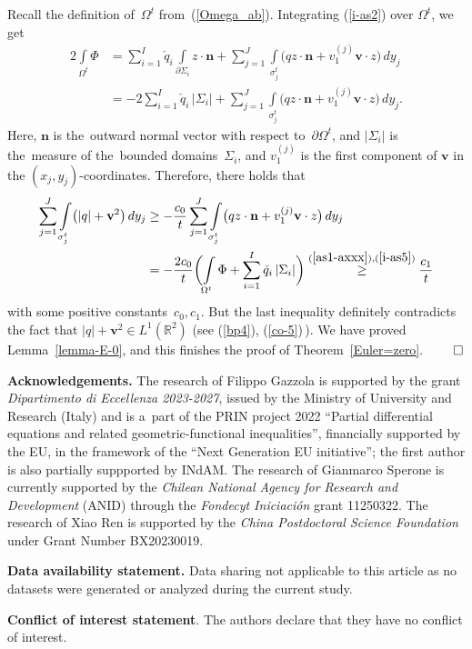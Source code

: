\documentclass[11pt]{article}
\numberwithin{equation}{section}
\numberwithin{figure}{section}
\newcommand{\R}{\mathbb{R}}
\def\R{{\mathbb R}}
\def\ve{{\mathbf v}}
\def\n{{\mathbf n}}
\begin{document}
Recall the definition of~$\Omega^t$ from~(\ref{Omega_ab}). 
Integrating (\ref{i-as2}) over $\Omega^t$, we get
\begin{align}\label{i-as8}
	2\int\limits_{\Omega^t}\Phi&=
\sum\limits_{i=1}^I\check q_i\int\limits_{\partial\Sigma_i}z\cdot\n+
\sum\limits_{j=1}^J\int\limits_{\sigma^t_j}\bigl(q z\cdot\n+ v_{1}^{(j)} \ve\cdot z\bigr)\,dy_j \nonumber \\
 &=-2\sum\limits_{i=1}^I\check q_i\,|\Sigma_i|+\sum\limits_{j=1}^J\int\limits_{\sigma^t_j}\bigl(q z\cdot\n + v_{1}^{(j)} \ve\cdot z \bigr)\,dy_j.
\end{align}
Here, $\n$ is the~outward normal vector with respect to~$\partial\Omega^t$, and  $|\Sigma_i|$ is the~measure of the~bounded domains~$\Sigma_i$,  and $v_1^{(j)}$ is the first component of $\mathbf{v}$ in the $(x_j, y_j)$-coordinates.
Therefore, there holds that
\begin{align}\label{i-as9}
	\sum\limits_{j=1}^J\int\limits_{\sigma^t_j}\bigl(|q|+\ve^2\bigr)\,dy_j&\ge-\frac{c_0}t
\sum\limits_{j=1}^J\int\limits_{\sigma^t_j}\bigl(q z\cdot\n + v_{1}^{(j)} \ve\cdot z\bigr)\,dy_j \nonumber \\
&=-
\frac{2c_0}t
\biggl(\int\limits_{\Omega^t}\Phi+
\sum\limits_{i=1}^I\check q_i\, |\Sigma_i|\biggr)\overset{(\ref{as1-axxx}),(\ref{i-as5})}\ge\frac{c_1}t
\end{align}
with some positive constants~$c_0,c_1$. But the last inequality definitely contradicts the fact that
$|q|+\ve^2\in L^1(\R^2)$ (see (\ref{bp4}), (\ref{co-5})\,). We have proved Lemma~\ref{lemma-E-0}, and this finishes the proof of Theorem~\ref{Euler=zero}.  $\qed$

\medskip

\noindent
{\bf Acknowledgements.} The research of Filippo Gazzola is supported by the grant \textit{Dipartimento di Eccellenza 2023-2027},
issued by the Ministry of University and Research (Italy) and is a~part of the PRIN project 2022 ``Partial differential equations and related geometric-functional inequalities'', financially supported by the EU, in the framework of the ``Next Generation EU initiative''; the first author is also partially suppported by INdAM. The research of Gianmarco Sperone is currently supported by the \textit{Chilean National Agency for Research and Development} (ANID) through the \textit{Fondecyt Iniciación} grant 11250322. The research of Xiao Ren is supported by  the \textit{China Postdoctoral Science
Foundation} under Grant Number BX20230019.
\par\smallskip
\noindent
{\bf Data availability statement.} Data sharing not applicable to this article as no datasets were generated or analyzed during the current study.
\par\smallskip
\noindent
{\bf Conflict of interest statement}.  The authors declare that they have no conflict of interest.
\end{document}
